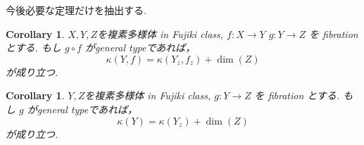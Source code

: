 \documentclass[dvipdfmx,a4paper,11pt]{article} %
\newtheorem{cor}[thm]{Corollary}
\newtheorem{prop}[thm]{Proposition}
\theoremstyle{definition}
\theoremstyle{remark}
\numberwithin{equation}{section}
\begin{document}

今後必要な定理だけを抽出する. 


\begin{cor}\cite[Corollary 4.6]{Cam04}
\label{cor-Cam04-4.6}
$X, Y, Z$を複素多様体 in Fujiki class,
\(f : X \to Y\) \(g : Y \to Z\) を fibration とする.
もし \(g \circ f\) がgeneral typeであれば，
\[
\kappa(Y,f) = \kappa(Y_z,f_z) + \dim(Z)
\]
が成り立つ.
\end{cor}

\begin{cor}\cite[Corollary 4.7]{Cam04}
\label{cor-Cam04-4.7}
$Y, Z$を複素多様体 in Fujiki class,
 \(g : Y \to Z\) を fibration とする.
もし \(g\) がgeneral typeであれば，
\[
\kappa(Y) = \kappa(Y_z) + \dim(Z)
\]
が成り立つ.
\end{cor}
\end{document}
